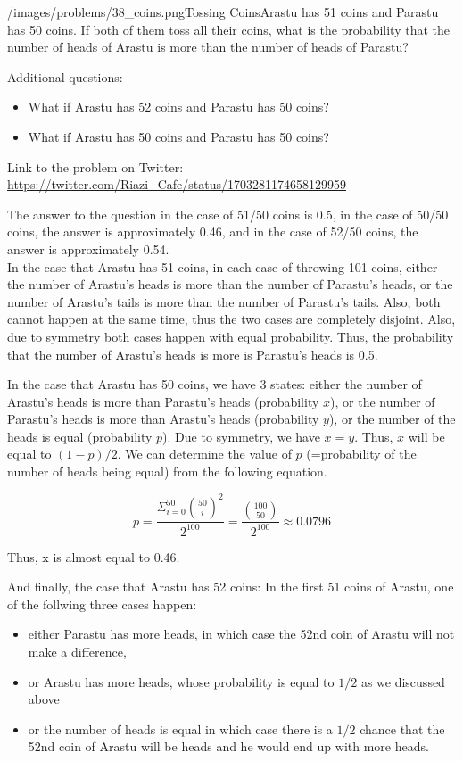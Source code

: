 \begin{problem}{/images/problems/38_coins.png}{Tossing Coins}Arastu has 51 coins and Parastu has 50 coins. If both of them toss all their coins, what is the probability that the number of heads of Arastu  is more than the number of heads of Parastu?

Additional questions:
\begin{itemize}
\item What if Arastu has 52 coins and  Parastu has 50 coins?
\item What if Arastu has 50 coins and  Parastu has 50 coins?
\end{itemize}

Link to the problem on Twitter:  \url{https://twitter.com/Riazi_Cafe/status/1703281174658129959}\end{problem}
\begin{solution}
The answer to the question in the case of 51/50 coins is 0.5, in the case of 50/50 coins, the answer is approximately 0.46, and in the case of 52/50 coins, the answer is approximately 0.54.\\[0.2cm]

In the case that Arastu has 51 coins, in each case of throwing 101 coins, either the number of Arastu's heads is more than the number of Parastu's heads, or the number of Arastu's tails is more than the number of Parastu's tails. Also, both cannot happen at the same time, thus the two cases are completely disjoint. Also, due to symmetry both cases happen with equal probability. Thus, the probability that the number of Arastu's heads is more is Parastu's heads is 0.5.

In the case that Arastu has 50 coins, we have 3 states: either the number of Arastu's heads is more than Parastu's heads (probability $x$), or the number of Parastu's heads is more than Arastu's heads (probability $y$), or the number of the heads is equal (probability $p$). Due to symmetry, we have $x=y$. Thus, $x$ will be equal to $(1-p)/2$.
We can determine  the value of $p$ (=probability of the number of heads being equal) from the following equation. 

$$
p = \frac{\Sigma_{i=0}^{50}{50 \choose i}^2}{2^{100}} = \frac{{100 \choose 50}}{2^{100}} \approx 0.0796
$$

Thus, x is almost equal to 0.46.


And finally, the case that Arastu has 52 coins: In the first 51 coins of Arastu, one of the follwing three cases happen:
\begin{itemize}
\item either Parastu has more heads, in which case the 52nd coin of Arastu will not make a difference,
\item or Arastu has more heads, whose probability is equal to $1/2$ as we discussed above
\item or the number of heads is equal in which case there is a $1/2$ chance that the 52nd coin of Arastu will be heads and he would end up with more heads. 
\end{itemize}


\end{solution}
